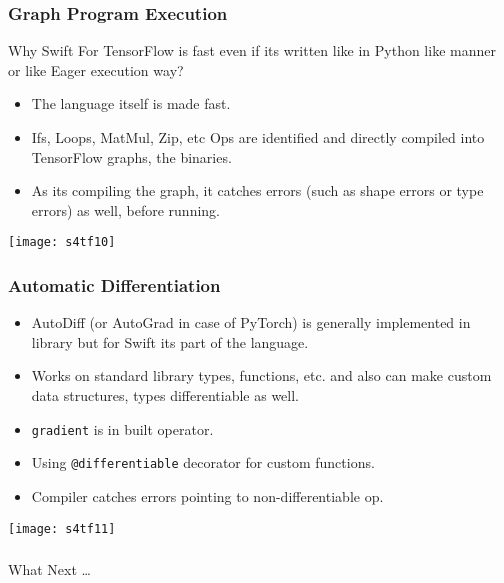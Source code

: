 \begin{frame}[fragile] \frametitle{Graph Program Execution}

Why Swift For TensorFlow is fast even if its written like in Python like manner or like Eager execution way?

\begin{itemize}
\item The language itself is made fast.
\item Ifs, Loops, MatMul, Zip, etc Ops are identified and directly compiled into TensorFlow graphs, the binaries.
\item As its compiling the graph, it catches errors (such as shape errors or type errors) as well, before running.
\end{itemize}

\begin{center}
\texttt{[image: s4tf10]}
\end{center}
\end{frame}

\begin{frame}[fragile] \frametitle{Automatic Differentiation}

\begin{itemize}
\item AutoDiff (or AutoGrad in case of PyTorch) is generally implemented in library but for Swift its part of the language.
\item Works on standard library types, functions, etc. and also can make custom data structures, types differentiable as well.
\item \lstinline|gradient| is in built operator.
\item Using \lstinline|@differentiable| decorator for custom functions.
\item Compiler catches errors pointing to non-differentiable op.
\end{itemize}

\begin{center}
\texttt{[image: s4tf11]}
\end{center}
\end{frame}


\begin{frame}[fragile]\frametitle{}
\begin{center}
{\Large What Next \ldots }
\end{center}
\end{frame}


